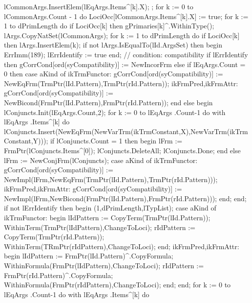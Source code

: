       lCommonArgs.InsertElem(lEqArgs.Items^[k].X);
   ;
   for k  :=  0 to lCommonArgs.Count - 1 do
      LociOcc[lCommonArgs.Items^[k].X] := true;
   for k := 1 to dPrimLength do
      if LociOcc[k] then
         gPrimaries[k]^.WithinType();
   lArgs.CopyNatSet(lCommonArgs);
   for k := 1 to dPrimLength do
      if LociOcc[k] then
         lArgs.InsertElem(k);
   if not lArgs.IsEqualTo(lId.ArgsSet) then
   begin ErrImm(189); lErrIdentify := true end;
   //  condition: compatibility
   if lErrIdentify then
      gCorrCond[ord(syCompatibility)] := NewIncorFrm
   else if lEqArgs.Count = 0 then
      case aKind of
         ikTrmFunctor:
            gCorrCond[ord(syCompatibility)] := NewEqFrm(TrmPtr(lId.Pattern),TrmPtr(rId.Pattern));
         ikFrmPred,ikFrmAttr:
            gCorrCond[ord(syCompatibility)] := NewBicond(FrmPtr(lId.Pattern),FrmPtr(rId.Pattern));
      end
   else
   begin
      lConjuncts.Init(lEqArgs.Count,2);
      for k := 0 to lEqArgs .Count-1 do
         with lEqArgs .Items^[k] do
            lConjuncts.Insert(NewEqFrm(NewVarTrm(ikTrmConstant,X),NewVarTrm(ikTrmConstant,Y)));
      if lConjuncts.Count = 1 then
      begin
         lFrm := FrmPtr(lConjuncts.Items^[0]);
         lConjuncts.DeleteAll; lConjuncts.Done;
      end
      else lFrm := NewConjFrm(lConjuncts);
   case aKind of
      ikTrmFunctor:
         gCorrCond[ord(syCompatibility)] := 
         NewImpl(lFrm,NewEqFrm(TrmPtr(lId.Pattern),TrmPtr(rId.Pattern)));
      ikFrmPred,ikFrmAttr:
         gCorrCond[ord(syCompatibility)] := 
                   NewImpl(lFrm,NewBicond(FrmPtr(lId.Pattern),FrmPtr(rId.Pattern)));
   end;
   end;
   if not lErrIdentify then
   begin
      (1,dPrimLength,lTypList);
      case aKind of
         ikTrmFunctor:
            begin
               lIdPattern := CopyTerm(TrmPtr(lId.Pattern));
               WithinTerm(TrmPtr(lIdPattern),ChangeToLoci);
               rIdPattern := CopyTerm(TrmPtr(rId.Pattern));
               WithinTerm(TRmPtr(rIdPattern),ChangeToLoci);
            end;
         ikFrmPred,ikFrmAttr:
            begin
               lIdPattern := FrmPtr(lId.Pattern)^.CopyFormula;
               WithinFormula(FrmPtr(lIdPattern),ChangeToLoci);
               rIdPattern := FrmPtr(rId.Pattern)^.CopyFormula;
               WithinFormula(FrmPtr(rIdPattern),ChangeToLoci);
            end;
      end;
      for k := 0 to lEqArgs .Count-1 do  with lEqArgs .Items^[k] do
